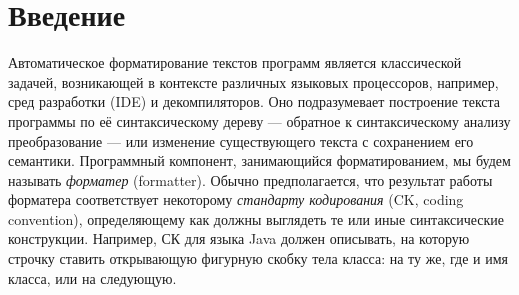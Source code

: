 \documentclass[conference]{IEEEtran}
\begin{document}
\section{Введение}
Автоматическое форматирование текстов программ является
классической задачей, возникающей в контексте различных 
языковых процессоров, например, сред разработки (IDE) и декомпиляторов.
Оно подразумевает построение текста программы по её синтаксическому
дереву --- обратное к синтаксическому анализу преобразование ---
или изменение существующего текста с сохранением его семантики.
Программный компонент, занимающийся форматированием, мы будем называть
\emph{форматер} (formatter).
Обычно предполагается, что результат работы форматера
соответствует некоторому
\emph{стандарту кодирования} (CK, coding convention), определяющему
как должны выглядеть те или иные синтаксические конструкции.
Например, СК для языка Java должен описывать, на которую
строчку ставить открывающую фигурную скобку тела класса: 
на ту же, где и имя класса, или на следующую.









\end{document}
